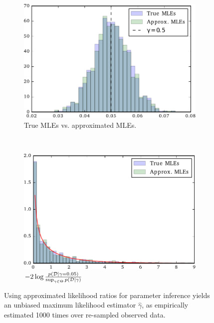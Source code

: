 \documentclass[12pt]{article}
\numberwithin{equation}{section}
\theoremstyle{plain}
\begin{document}
\begin{figure}
    \centering

    \begin{subfigure}[t]{0.45\textwidth}
        \includegraphics[width=\textwidth]{figures/fig2a.pdf}
        \caption{True MLEs vs. approximated MLEs.}
        \label{fig:2a}
    \end{subfigure}
    ~ %
    \begin{subfigure}[t]{0.45\textwidth}
        \includegraphics[width=\textwidth]{figures/fig2b.pdf}
        \caption{$-2 \log \frac{p({\cal D}|\gamma=0.05)}{\sup_{\gamma \in \Theta} p({\cal D} | \gamma)}$}
        \label{fig:2b}
    \end{subfigure}

    \caption{Using approximated likelihood ratios for parameter inference yields an unbiased maximum likelihood estimator
            $\hat \gamma$, as empirically estimated 1000 times over re-sampled observed data.}
    \label{fig:2}
\end{figure}
\end{document}
